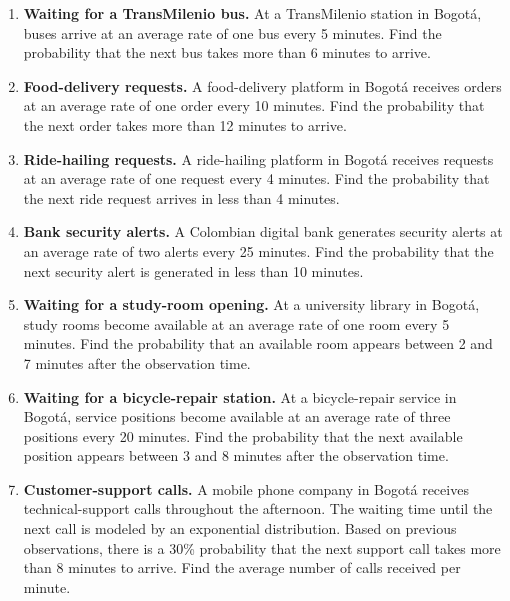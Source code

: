 \begin{enumerate}[
	leftmargin=*,
	itemsep=4pt,
	parsep=0pt,
	topsep=2pt
	]
	
	
	\item
	\textbf{Waiting for a TransMilenio bus.}
	At a TransMilenio station in Bogotá, buses arrive at an average rate of
	one bus every 5 minutes. Find the probability that the next bus takes
	more than 6 minutes to arrive.
	
	\item
	\textbf{Food-delivery requests.}
	A food-delivery platform in Bogotá receives orders at an average rate of
	one order every 10 minutes. Find the probability that the next order takes
	more than 12 minutes to arrive.
	
	\item
	\textbf{Ride-hailing requests.}
	A ride-hailing platform in Bogotá receives requests at an average rate of
	one request every 4 minutes. Find the probability that the next ride
	request arrives in less than 4 minutes.
	
	\item
	\textbf{Bank security alerts.}
	A Colombian digital bank generates security alerts at an average rate of
	two alerts every 25 minutes. Find the probability that the next security
	alert is generated in less than 10 minutes.
	
	\item
	\textbf{Waiting for a study-room opening.}
	At a university library in Bogotá, study rooms become available at an
	average rate of one room every 5 minutes. Find the probability that an
	available room appears between 2 and 7 minutes after the observation time.
	
	\item
	\textbf{Waiting for a bicycle-repair station.}
	At a bicycle-repair service in Bogotá, service positions become available
	at an average rate of three positions every 20 minutes. Find the probability
	that the next available position appears between 3 and 8 minutes after the
	observation time.
	
	
	\item
	\textbf{Customer-support calls.}
	A mobile phone company in Bogotá receives technical-support calls
	throughout the afternoon. The waiting time until the next call is modeled
	by an exponential distribution. Based on previous observations, there is a
	30\% probability that the next support call takes more than 8 minutes to
	arrive. Find the average number of calls received per minute.
	

\end{enumerate}
